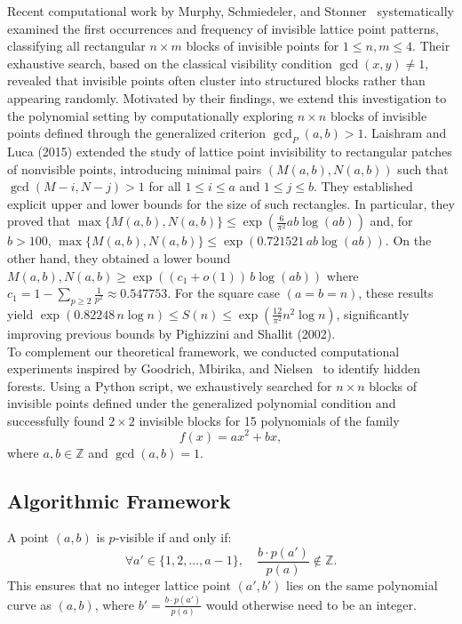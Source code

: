 \documentclass[12pt, reqno]{amsart}
\theoremstyle{definition}
\theoremstyle{remark}
\numberwithin{equation}{section}
\begin{document}
Recent computational work by Murphy, Schmiedeler, and Stonner~\cite{Nolan}
systematically examined the first occurrences and frequency of invisible lattice point patterns,
classifying all rectangular $n\times m$ blocks of invisible points for $1 \leq n,m \leq 4$.
Their exhaustive search, based on the classical visibility condition $\gcd(x,y) \neq 1$, 
revealed that invisible points often cluster into structured blocks rather than appearing randomly. 
Motivated by their findings, we extend this investigation to the polynomial setting by 
computationally exploring $n\times n$ blocks of invisible points defined through the generalized 
criterion $\gcd_{P}(a,b) > 1$. 
Laishram and Luca (2015) \cite{shanta}extended the study of lattice point invisibility to rectangular patches of nonvisible points, introducing minimal pairs $(M(a,b), N(a,b))$ such that $\gcd(M - i, N - j) > 1$ for all $1 \le i \le a$ and $1 \le j \le b$. They established explicit upper and lower bounds for the size of such rectangles. In particular, they proved that 
$\max\{M(a,b), N(a,b)\} \le \exp\!\left(\frac{6}{\pi^2}ab\log(ab)\right)$ and, for $b > 100$, $\max\{M(a,b), N(a,b)\} \le \exp(0.721521\,ab\log(ab))$. 
On the other hand, they obtained a lower bound 
$M(a,b), N(a,b) \ge \exp((c_1 + o(1))\,b\log(ab))$ where $c_1 = 1 - \sum_{p\ge2} \frac{1}{p^2} \approx 0.547753$. 
For the square case $(a = b = n)$, these results yield 
$\exp(0.82248\,n\log n) \le S(n) \le \exp\!\left(\frac{12}{\pi^2}n^2\log n\right)$, significantly improving previous bounds by Pighizzini and Shallit (2002).\\

\hspace{0.2em}To complement our theoretical framework, we conducted computational experiments inspired by Goodrich, Mbirika, and Nielsen~\cite{Austin Goodrich} to identify hidden forests. Using a Python script, we exhaustively searched for $n \times n$ blocks of invisible points defined under the generalized polynomial condition and successfully found $2 \times 2$ invisible blocks for  15 polynomials of the family 
\[
f(x) = a x^{2} + b x,
\]
where $a, b \in \mathbb{Z}$ and $\gcd(a, b) = 1$.


\subsection{Algorithmic Framework}\medskip

 A point \( (a, b) \) is \( p \)-visible if and only if:
\[
\forall a' \in \{1, 2, \dots, a-1\}, \quad \frac{b \cdot p(a')}{p(a)} \notin \mathbb{Z}.
\]
This ensures that no integer lattice point \( (a', b') \) lies on the same polynomial curve as \( (a, b) \), where \( b' = \frac{b \cdot p(a')}{p(a)} \) would otherwise need to be an integer.\\
\end{document}

